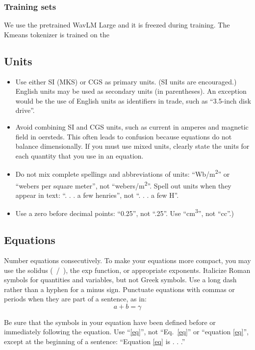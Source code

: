 \documentclass[conference]{IEEEtran}
\begin{document}
\subsubsection{Training sets}
We use the pretrained WavLM Large and it is freezed during training. The Kmeans tokenizer is trained on the 


\subsection{Units}
\begin{itemize}
\item Use either SI (MKS) or CGS as primary units. (SI units are encouraged.) English units may be used as secondary units (in parentheses). An exception would be the use of English units as identifiers in trade, such as ``3.5-inch disk drive''.
\item Avoid combining SI and CGS units, such as current in amperes and magnetic field in oersteds. This often leads to confusion because equations do not balance dimensionally. If you must use mixed units, clearly state the units for each quantity that you use in an equation.
\item Do not mix complete spellings and abbreviations of units: ``Wb/m\textsuperscript{2}'' or ``webers per square meter'', not ``webers/m\textsuperscript{2}''. Spell out units when they appear in text: ``. . . a few henries'', not ``. . . a few H''.
\item Use a zero before decimal points: ``0.25'', not ``.25''. Use ``cm\textsuperscript{3}'', not ``cc''.)
\end{itemize}

\subsection{Equations}
Number equations consecutively. To make your 
equations more compact, you may use the solidus (~/~), the exp function, or 
appropriate exponents. Italicize Roman symbols for quantities and variables, 
but not Greek symbols. Use a long dash rather than a hyphen for a minus 
sign. Punctuate equations with commas or periods when they are part of a 
sentence, as in:
\begin{equation}
a+b=\gamma\label{eq}
\end{equation}

Be sure that the 
symbols in your equation have been defined before or immediately following 
the equation. Use ``\eqref{eq}'', not ``Eq.~\eqref{eq}'' or ``equation \eqref{eq}'', except at 
the beginning of a sentence: ``Equation \eqref{eq} is . . .''
\end{document}
